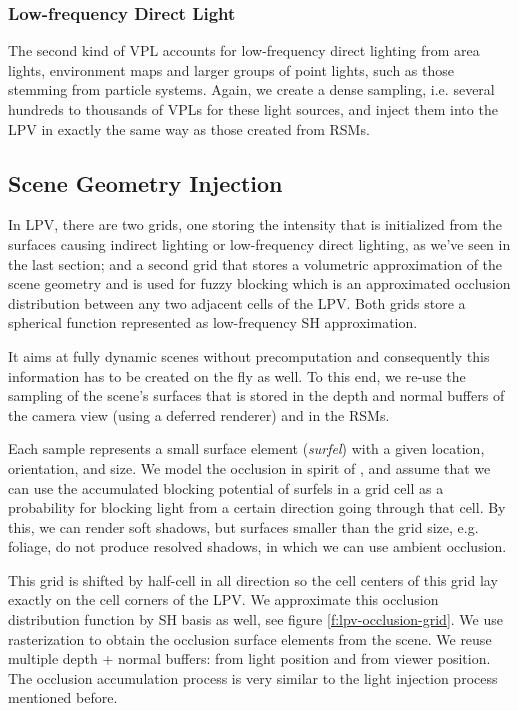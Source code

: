 \subsubsection{Low-frequency Direct Light}
The second kind of VPL accounts for low-frequency direct lighting from area lights, environment maps and larger groups of point lights, such as those stemming from particle systems. Again, we create a dense sampling, i.e. several hundreds to thousands of VPLs for these light sources, and inject them into the LPV in exactly the same way as those created from RSMs.




\subsection{Scene Geometry Injection}
In LPV, there are two grids, one storing the intensity that is initialized from the surfaces causing indirect lighting or low-frequency direct lighting, as we've seen in the last section; and a second grid that stores a volumetric approximation of the scene geometry and is used for fuzzy blocking which is an approximated occlusion distribution between any two adjacent cells of the LPV. Both grids store a spherical function represented as low-frequency SH approximation.

It aims at fully dynamic scenes without precomputation and consequently this information has to be created on the fly as well. To this end, we re-use the sampling of the scene's surfaces that is stored in the depth and normal buffers of the camera view (using a deferred renderer) and in the RSMs.

Each sample represents a small surface element (\textit{surfel}) with a given location, orientation, and size. We model the occlusion in spirit of \cite{a:AUnifiedHierarchicalAlgorithmforGlobalIlluminationwithScatteringVolumesandObjectClusters}, and assume that we can use the accumulated blocking potential of surfels in a grid cell as a probability for blocking light from a certain direction going through that cell. By this, we can render soft shadows, but surfaces smaller than the grid size, e.g. foliage, do not produce resolved shadows, in which we can use ambient occlusion.

This grid is shifted by half-cell in all direction so the cell centers of this grid lay exactly on the cell corners of the LPV. We approximate this occlusion distribution function by SH basis as well, see figure \ref{f:lpv-occlusion-grid}. We use rasterization to obtain the occlusion surface elements from the scene. We reuse multiple depth + normal buffers: from light position and from viewer position. The occlusion accumulation process is very similar to the light injection process mentioned before. 

